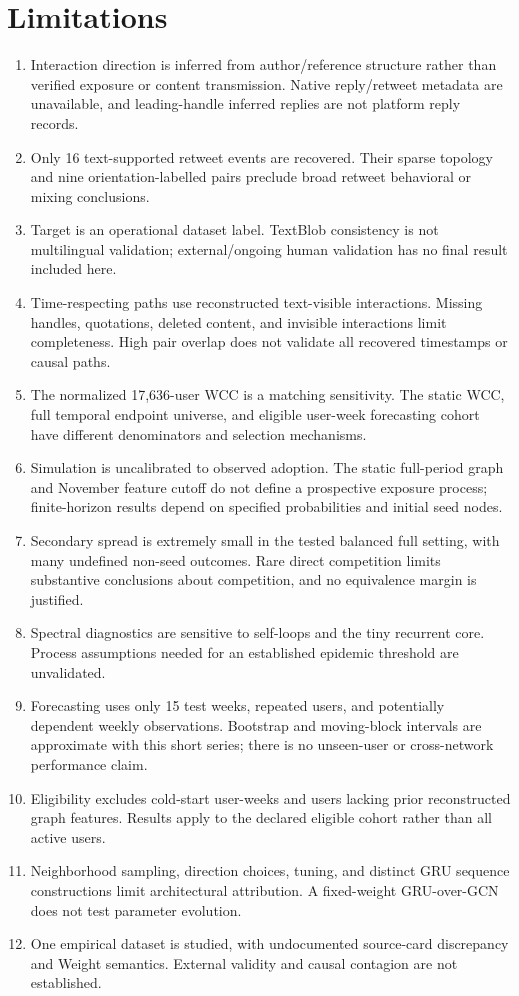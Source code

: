 \documentclass[11pt,a4paper]{article}
\begin{document}
\section{Limitations}
\begin{enumerate}[leftmargin=7mm]
\item Interaction direction is inferred from author/reference structure rather than verified exposure or content transmission. Native reply/retweet metadata are unavailable, and leading-handle inferred replies are not platform reply records.
\item Only 16 text-supported retweet events are recovered. Their sparse topology and nine orientation-labelled pairs preclude broad retweet behavioral or mixing conclusions.
\item Target is an operational dataset label. TextBlob consistency is not multilingual validation; external/ongoing human validation has no final result included here.
\item Time-respecting paths use reconstructed text-visible interactions. Missing handles, quotations, deleted content, and invisible interactions limit completeness. High pair overlap does not validate all recovered timestamps or causal paths.
\item The normalized 17,636-user WCC is a matching sensitivity. The static WCC, full temporal endpoint universe, and eligible user-week forecasting cohort have different denominators and selection mechanisms.
\item Simulation is uncalibrated to observed adoption. The static full-period graph and November feature cutoff do not define a prospective exposure process; finite-horizon results depend on specified probabilities and initial seed nodes.
\item Secondary spread is extremely small in the tested balanced full setting, with many undefined non-seed outcomes. Rare direct competition limits substantive conclusions about competition, and no equivalence margin is justified.
\item Spectral diagnostics are sensitive to self-loops and the tiny recurrent core. Process assumptions needed for an established epidemic threshold are unvalidated.
\item Forecasting uses only 15 test weeks, repeated users, and potentially dependent weekly observations. Bootstrap and moving-block intervals are approximate with this short series; there is no unseen-user or cross-network performance claim.
\item Eligibility excludes cold-start user-weeks and users lacking prior reconstructed graph features. Results apply to the declared eligible cohort rather than all active users.
\item Neighborhood sampling, direction choices, tuning, and distinct GRU sequence constructions limit architectural attribution. A fixed-weight GRU-over-GCN does not test parameter evolution.
\item One empirical dataset is studied, with undocumented source-card discrepancy and Weight semantics. External validity and causal contagion are not established.
\end{enumerate}
\end{document}
